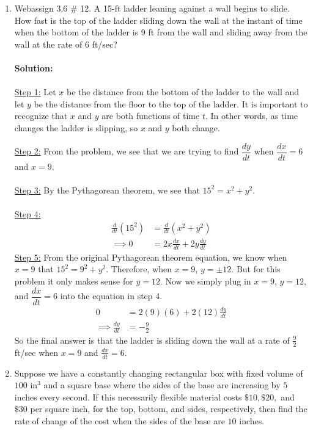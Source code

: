 \documentclass[reqno,psamsfonts]{amsart}
\theoremstyle{definition}
\theoremstyle{remark}
\numberwithin{equation}{section}
\begin{document}
\begin{enumerate}
\item Webassign 3.6 \# 12. A 15-ft ladder leaning against a wall begins to slide. How fast is the top of the ladder sliding down the wall at the instant of time when the bottom of the ladder is 9 ft from the wall and sliding away from the wall at the rate of 6 ft/sec?
\\
\\\textbf{Solution:}
\\
\\
\underline{Step 1:} 
Let $x$ be the distance from the bottom of the ladder to the wall and let $y$ be the distance from the floor to the top of the ladder. It is important to recognize that $x$ and $y$ are both functions of time $t$. In other words, as time changes the ladder is slipping, so $x$ and $y$ both change. 
\begin{center}
\end{center}
\underline{Step 2:} From the problem, we see that we are trying to find $\dfrac{dy}{dt}$ when $\dfrac{dx}{dt}=6$ and $x=9$. 
\\
\\\underline{Step 3:} By the Pythagorean theorem, we see that $15^2=x^2+y^2$. 
\\
\\\underline{Step 4:}
\begin{align*}
\frac{d}{dt}(15^2)&=\frac{d}{dt}(x^2+y^2)\\
\implies 0&= 2x\frac{dx}{dt}+2y\frac{dy}{dt}
\end{align*}
\underline{Step 5:} From the original Pythagorean theorem equation, we know when $x =9$ that $15^2 =9^2+y^2$. Therefore, when $x=9$, $y=\pm12$. But for this problem it only makes sense for $y=12$. Now we simply plug in $x=9$, $y=12$, and $\dfrac{dx}{dt}=6$ into the equation in step 4. 
\begin{align*}
0&=2(9)(6)+2(12)\frac{dy}{dt}\\
\implies \frac{dy}{dt}&=-\frac{9}{2}
\end{align*}
So the final answer is that the ladder is sliding down the wall at a rate of $\frac{9}{2}$ ft/sec when $x=9$ and $\frac{dx}{dt}=6$. 
\\
\item Suppose we have a constantly changing rectangular box with fixed volume of $100\text{ in}^3$ and a square base where the sides of the base are increasing by $5$ inches every second. If this necessarily flexible material costs $\$10, \$20,$ and $\$30$ per square inch, for the top, bottom, and sides, respectively, then find the rate of change of the cost when the sides of the base are $10$ inches.

\end{enumerate}
\end{document}
